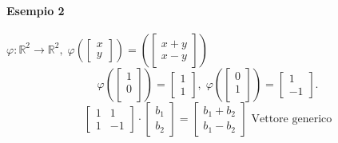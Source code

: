 \documentclass[a4paper, 12pt]{report}
\begin{document}
            \paragraph{Esempio 2}$\varphi:\mathbb{R}^2\rightarrow \mathbb{R}^2, \;
            \varphi \left(
            \begin{bmatrix}
                x\\
                y
            \end{bmatrix}
            \right)
            =
            \left(
            \begin{bmatrix}
                x+y\\
                x-y    
            \end{bmatrix}
            \right)
            $
            $$
            \varphi \left ( 
                \begin{bmatrix}
                    1\\
                    0\\
                \end{bmatrix}    
                \right )
                =
                \begin{bmatrix}
                    1\\
                    1
                \end{bmatrix},\;
                \varphi \left ( 
                \begin{bmatrix}
                    0\\
                    1\\
                \end{bmatrix}    
                \right )
                =
                \begin{bmatrix}
                    1\\
                    -1
                \end{bmatrix}.
            $$
            $$
            \begin{bmatrix}
                1 & 1\\
                1 & -1
            \end{bmatrix}
            \cdot
            \begin{bmatrix}
                b_1\\
                b_2
            \end{bmatrix}
            =
            \begin{bmatrix}
                b_1+b_2\\
                b_1-b_2
            \end{bmatrix}
            \text{ Vettore generico}
            $$
\end{document}
